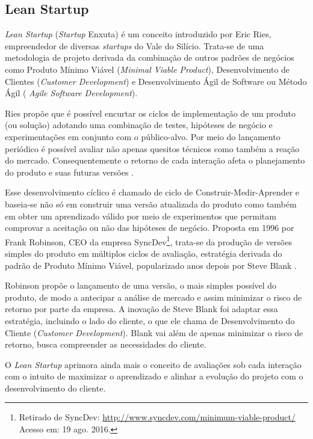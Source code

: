 \subsection{Lean Startup}
\par \emph{Lean Startup} (\emph{Startup} Enxuta) é um conceito introduzido por Eric Ries, empreendedor de diversas \emph{startups} do Vale do Silício. Trata-se de uma metodologia de projeto derivada da combinação de outros padrões de negócios como Produto Mínimo Viável (\emph{Minimal Viable Product}), Desenvolvimento de Clientes (\emph{Customer Development}) e Desenvolvimento Ágil de Software ou Método Ágil ( \emph{Agile Software Development}).
\par Ries propõe que é possível encurtar os ciclos de implementação de um produto (ou solução) adotando uma combinação de testes, hipóteses de negócio e experimentações em conjunto com o público-alvo. Por meio do lançamento periódico é possível avaliar não apenas quesitos técnicos como também a reação do mercado. Consequentemente o retorno de cada interação afeta o planejamento do produto e suas futuras versões \citep{ries:11}.
\par Esse desenvolvimento cíclico é chamado de ciclo de Construir-Medir-Aprender e baseia-se não só em construir uma versão atualizada do produto como também em obter um aprendizado válido por meio de experimentos que permitam comprovar a aceitação ou não das hipóteses de negócio. Proposta em 1996 por Frank Robinson, CEO da empresa SyncDev\footnote{ Retirado de SyncDev: \url{http://www.syncdev.com/minimum-viable-product/} Acesso em: 19 ago. 2016.}, trata-se da produção de versões simples do produto em múltiplos ciclos de avaliação, estratégia derivada do padrão de Produto Mínimo Viável, popularizado anos depois por Steve Blank \citep{junk:2000}.
\par Robinson propõe o lançamento de uma versão, o mais simples possível do produto, de modo a antecipar a análise de mercado e assim minimizar o risco de retorno por parte da empresa. A inovação de Steve Blank foi adaptar essa estratégia, incluindo o lado do cliente, o que ele chama de Desenvolvimento do Cliente (\emph{Customer Development}). Blank vai além de apenas minimizar o risco de retorno, busca compreender as necessidades do cliente.
\par O \emph{Lean Startup} aprimora ainda mais o conceito de avaliações sob cada interação com o intuito de maximizar o aprendizado e alinhar a evolução do projeto com o desenvolvimento do cliente.

